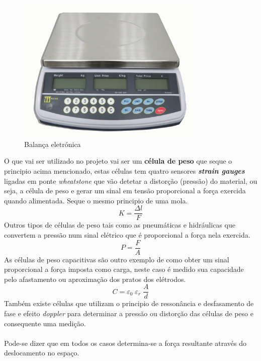 \\
\begin{figure}[H]
	\centering
	\includegraphics[height=7cm]{./image/PESTA/general/Scale_1.jpg}
	\caption{Balança eletrónica}
	\label{Scale_1}
\end{figure}
O que vai ser utilizado no projeto vai ser um \textbf{célula de peso} que seque o principio acima mencionado, estas células tem quatro sensores \textit{\textbf{strain gauges}} ligadas em ponte \textit{wheatstone} que vão detetar a distorção (pressão) do material, ou seja, a célula de peso e gerar um sinal em tensão proporcional a força exercida quando alimentada. Seque o mesmo principio de uma mola.
\begin{equation}
	\label{eq:Hooke}
	K = \frac{\Delta l}{F}
\end{equation}
Outros tipos de células de peso tais como as pneumáticas e hidráulicas que convertem a pressão num sinal elétrico que é proporcional a força nela exercida.
\begin{equation}
	\label{eq:Preasure}
	P = \frac{F}{A}
\end{equation}
As células de peso capacitivas são outro exemplo de como obter um sinal proporcional a força imposta como carga, neste caso é medido sua capacidade pelo afastamento ou aproximação dos pratos dos elétrodos.
\begin{equation}
	\label{eq:Capacity}
	C = \varepsilon_{0} \; \varepsilon_{r} \; \frac{A}{d}
\end{equation}
Também existe células que utilizam o principio de ressonância e desfasamento de fase e efeito \textit{doppler} para determinar a pressão ou distorção das células de peso e consequente uma medição.
\\
\\
Pode-se dizer que em todos os casos determina-se a força resultante através do deslocamento no espaço.
